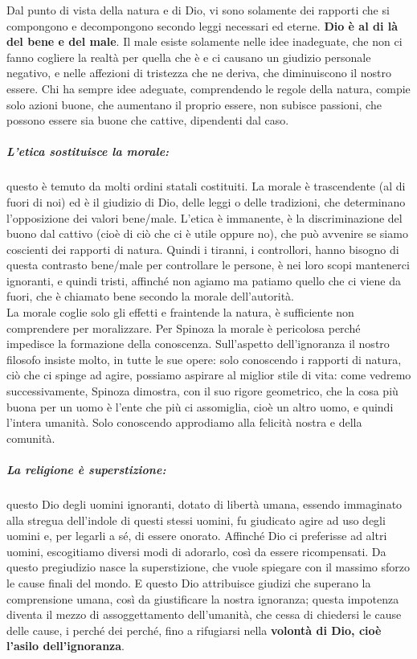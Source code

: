 Dal punto di vista della natura e di Dio, vi sono solamente dei rapporti che si compongono e decompongono secondo leggi necessari ed eterne. \textbf{Dio è al di là del bene e del male}. Il male esiste solamente nelle idee inadeguate, che non ci fanno cogliere la realtà per quella che è e ci causano un giudizio personale negativo, e nelle affezioni di tristezza che ne deriva, che diminuiscono il nostro essere. Chi ha sempre idee adeguate, comprendendo le regole della natura, compie solo azioni buone, che aumentano il proprio essere, non subisce passioni, che possono essere sia buone che cattive, dipendenti dal caso.
\subparagraph{L'etica sostituisce la morale:}questo è  temuto da molti ordini statali costituiti. La morale è trascendente (al di fuori di noi) ed è il giudizio di Dio, delle leggi  o delle tradizioni, che determinano l'opposizione dei valori bene/male. L'etica è immanente, è la discriminazione del buono dal cattivo (cioè di ciò che ci è utile oppure no), che può avvenire se siamo coscienti dei rapporti di natura. Quindi i tiranni, i controllori, hanno bisogno di questa contrasto bene/male per controllare le persone, è nei loro scopi mantenerci ignoranti, e quindi tristi, affinché non agiamo ma patiamo quello che ci viene da fuori, che è chiamato bene secondo la morale dell'autorità.\\
La morale coglie solo gli effetti e fraintende la natura, è sufficiente non comprendere per moralizzare. Per Spinoza la morale è pericolosa perché impedisce la formazione della conoscenza. Sull'aspetto dell'ignoranza il nostro filosofo insiste molto, in tutte le sue opere: solo conoscendo i rapporti di natura, ciò che ci spinge ad agire, possiamo aspirare al miglior stile di vita: come vedremo successivamente, Spinoza dimostra, con il suo rigore geometrico, che la cosa più buona per un uomo è l'ente che più ci assomiglia, cioè un altro uomo, e quindi l'intera umanità. Solo conoscendo approdiamo alla felicità nostra e della comunità.
\subparagraph{La religione è superstizione:}questo Dio degli uomini ignoranti, dotato di libertà umana, essendo immaginato alla stregua dell'indole di questi stessi uomini, fu giudicato agire ad uso degli uomini e, per legarli a sé, di essere onorato. Affinché Dio ci preferisse ad altri uomini, escogitiamo diversi modi di adorarlo, così da essere ricompensati. Da questo pregiudizio nasce la superstizione, che vuole spiegare con il massimo sforzo le cause finali del mondo. E questo Dio attribuisce giudizi che superano la comprensione umana, così da giustificare la nostra ignoranza; questa impotenza diventa il mezzo di assoggettamento dell'umanità, che cessa di chiedersi le cause delle cause, i perché dei perché, fino a rifugiarsi nella  \textbf{volontà di Dio, cioè l'asilo dell'ignoranza}.\\
